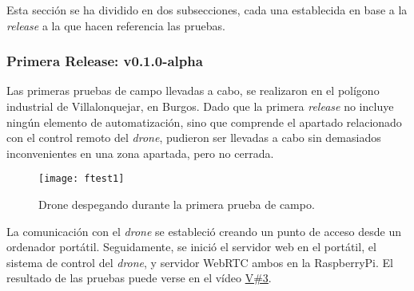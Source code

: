 Esta sección se ha dividido en dos subsecciones, cada una establecida en base a la \emph{release} a la que hacen referencia las pruebas. 


\subsubsection{Primera Release: v0.1.0-alpha}
\label{subsec:fieldTestingv1}

Las primeras pruebas de campo llevadas a cabo, se realizaron en el polígono industrial de Villalonquejar, en Burgos. 
Dado que la primera \emph{release} no incluye ningún elemento de automatización, sino que comprende el apartado relacionado con el control remoto del \emph{drone}, pudieron ser llevadas a cabo sin demasiados inconvenientes en una zona apartada, pero no cerrada. 

\begin{figure}[H]
	\centering
	\texttt{[image: ftest1]}
	\caption[Field Test 1. Villalonquejar]{Drone despegando durante la primera prueba de campo.}\label{fig:ftest1Drone}
\end{figure}

La comunicación con el \emph{drone} se estableció creando un punto de acceso desde un ordenador portátil. Seguidamente, se inició el servidor web en el portátil, el sistema de control del \emph{drone}, y servidor WebRTC ambos en la RaspberryPi. El resultado de las pruebas puede verse en el vídeo \href{https://universidaddeburgos-my.sharepoint.com/:v:/g/personal/mbm0089_alu_ubu_es/ERit03PQ4GVJvVXNLCxQQwUBUjZt6VjCwl5GcLUYwFQGPQ?e=dD258g}{V\#3}.

